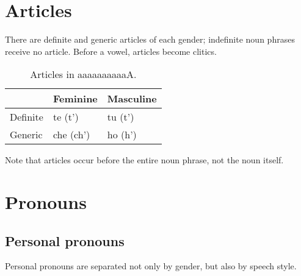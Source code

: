 \documentclass{book}
\newcommand{\lname}{aaaaaaaaaaA}
\begin{document}
\section{Articles}

There are definite and generic articles of each gender; indefinite noun phrases receive no article. Before a vowel, articles become clitics.

\begin{table}[h]
  \caption{Articles in \lname.}
  \centering
  \begin{tabular}{l|ll}
    & Feminine & Masculine \\
    \hline
    Definite & te (t') & tu (t') \\
    Generic & che (ch') & ho (h') \\
  \end{tabular}
\end{table}

Note that articles occur before the entire noun phrase, not the noun itself.

\section{Pronouns}

\subsection{Personal pronouns}

Personal pronouns are separated not only by gender, but also by speech style.
\end{document}
